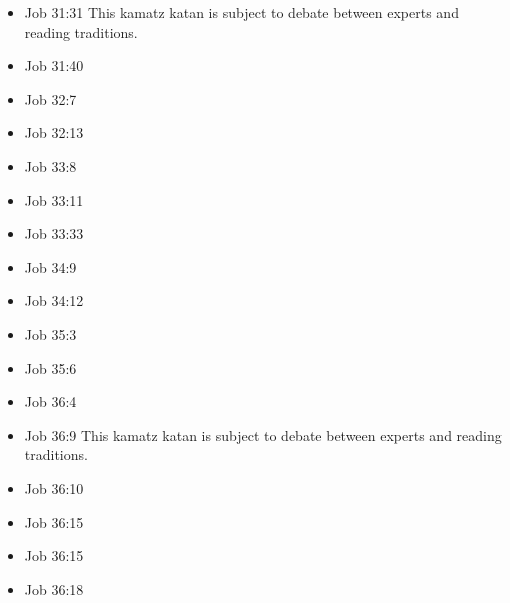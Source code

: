 \documentclass[14pt]{book}
\begin{document}
\begin{multicols}{2}
\begin{itemize}
															\item Job 31:31 This kamatz katan is subject to debate between experts and reading traditions.
															
															\item Job 31:40
															
															\item Job 32:7
															
															\item Job 32:13
															
															\item Job 33:8
															
															\item Job 33:11
															
															\item Job 33:33
															
															\item Job 34:9
															
															\item Job 34:12
															
															\item Job 35:3
															
															\item Job 35:6
															
															\item Job 36:4
															
															\item Job 36:9 This kamatz katan is subject to debate between experts and reading traditions.
															
															\item Job 36:10
															
															\item Job 36:15
															
															\item Job 36:15
															
															\item Job 36:18
															

\end{itemize}
\end{multicols}
\end{document}
